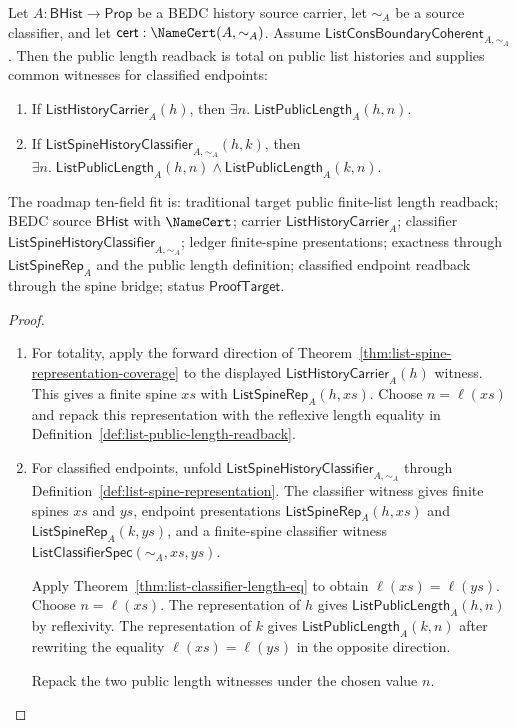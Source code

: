 \begin{theorem}
\label{thm:list-public-length-readback-total}
Let $A:\mathsf{BHist}\to\mathsf{Prop}$ be a BEDC history source carrier, let
$\sim_A$ be a source classifier, and let
$\mathsf{cert}:\NameCert(A,\sim_A)$. Assume
$\mathsf{ListConsBoundaryCoherent}_{A,\sim_A}$. Then the public length readback
is total on public list histories and supplies common witnesses for classified
endpoints:
\begin{enumerate}
  \item If $\mathsf{ListHistoryCarrier}_A(h)$, then
  $\exists n.\;\mathsf{ListPublicLength}_A(h,n)$.
  \item If $\mathsf{ListSpineHistoryClassifier}_{A,\sim_A}(h,k)$, then
  $\exists n.\;
  \mathsf{ListPublicLength}_A(h,n)\land
  \mathsf{ListPublicLength}_A(k,n)$.
\end{enumerate}
The roadmap ten-field fit is: traditional target public finite-list length
readback; BEDC source $\mathsf{BHist}$ with $\NameCert$; carrier
$\mathsf{ListHistoryCarrier}_A$; classifier
$\mathsf{ListSpineHistoryClassifier}_{A,\sim_A}$; ledger finite-spine
presentations; exactness through $\mathsf{ListSpineRep}_A$ and the public
length definition; classified endpoint readback through the spine bridge; status
$\mathsf{ProofTarget}$.
\end{theorem}
\begin{proof}
\begin{enumerate}
  \item For totality, apply the forward direction of
  Theorem~\ref{thm:list-spine-representation-coverage} to the displayed
  $\mathsf{ListHistoryCarrier}_A(h)$ witness. This gives a finite spine $xs$
  with $\mathsf{ListSpineRep}_A(h,xs)$. Choose $n=\ell(xs)$ and repack this
  representation with the reflexive length equality in
  Definition~\ref{def:list-public-length-readback}.

  \item For classified endpoints, unfold
  $\mathsf{ListSpineHistoryClassifier}_{A,\sim_A}$ through
  Definition~\ref{def:list-spine-representation}. The classifier witness gives
  finite spines $xs$ and $ys$, endpoint presentations
  $\mathsf{ListSpineRep}_A(h,xs)$ and $\mathsf{ListSpineRep}_A(k,ys)$, and a
  finite-spine classifier witness
  $\mathsf{ListClassifierSpec}(\sim_A,xs,ys)$.

  Apply Theorem~\ref{thm:list-classifier-length-eq} to obtain
  $\ell(xs)=\ell(ys)$. Choose $n=\ell(xs)$. The representation of $h$ gives
  $\mathsf{ListPublicLength}_A(h,n)$ by reflexivity. The representation of $k$
  gives $\mathsf{ListPublicLength}_A(k,n)$ after rewriting the equality
  $\ell(xs)=\ell(ys)$ in the opposite direction.

  Repack the two public length witnesses under the chosen value $n$.
\end{enumerate}
\end{proof}

